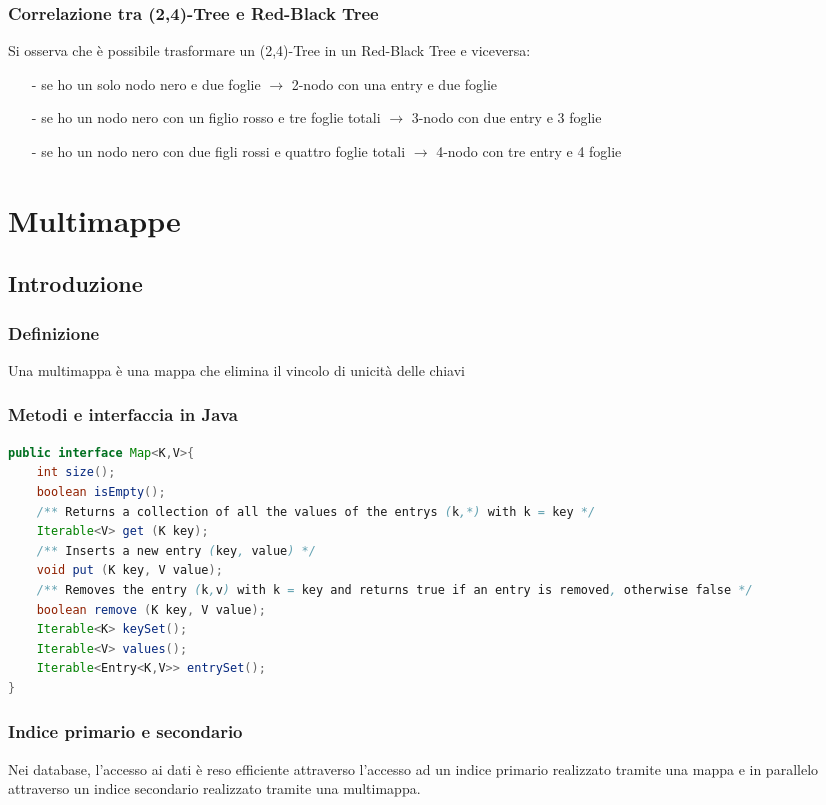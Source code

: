 \documentclass[a4paper]{article}
\begin{document}
\subsubsection*{Correlazione tra (2,4)-Tree e Red-Black Tree}
Si osserva che è possibile trasformare un (2,4)-Tree in un Red-Black Tree e viceversa:
\begin{itemize}[topsep=3pt, itemsep=0pt]
	\item[-] se ho un solo nodo nero e due foglie \(\rightarrow\) 2-nodo con una entry e due foglie
	\item[-] se ho un nodo nero con un figlio rosso e tre foglie totali \(\rightarrow\) 3-nodo con due entry e 3 foglie
	\item[-] se ho un nodo nero con due figli rossi e quattro foglie totali \(\rightarrow\) 4-nodo con tre entry e 4 foglie
\end{itemize}

\newpage

\section{Multimappe}
\subsection{Introduzione}
\subsubsection*{Definizione}
Una multimappa è una mappa che elimina il vincolo di unicità delle chiavi

\subsubsection*{Metodi e interfaccia in Java}
\begin{lstlisting}[language=Java]
public interface Map<K,V>{
	int size();
	boolean isEmpty();
	/** Returns a collection of all the values of the entrys (k,*) with k = key */
	Iterable<V> get (K key);
	/** Inserts a new entry (key, value) */
	void put (K key, V value);
	/** Removes the entry (k,v) with k = key and returns true if an entry is removed, otherwise false */
	boolean remove (K key, V value);
	Iterable<K> keySet();
	Iterable<V> values();
	Iterable<Entry<K,V>> entrySet();
}
\end{lstlisting}

\subsubsection*{Indice primario e secondario}
Nei database, l'accesso ai dati è reso efficiente attraverso l'accesso ad un indice primario realizzato tramite una mappa e
in parallelo attraverso un indice secondario realizzato tramite una multimappa.
\end{document}

